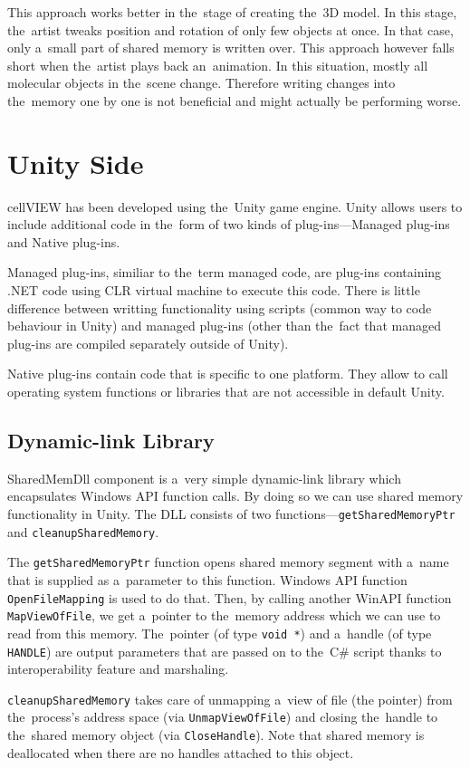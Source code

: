 \documentclass[
  digital, %
  table,   %
  nolof,     %
  nolot,     %
  oneside,
]{fithesis3}
\begin{document}
This approach works better in the stage of creating the 3D model. In this stage, the artist tweaks position and rotation of only few objects at once. In that case, only a small part of shared memory is written over. This approach however falls short when the artist plays back an animation. In this situation, mostly all molecular objects in the scene change. Therefore writing changes into the memory one by one is not beneficial and might actually be performing worse.

\section{Unity Side}
cellVIEW has been developed using the Unity game engine. Unity allows users to include additional code in the form of two kinds of plug-ins—Managed plug-ins and Native plug-ins.

Managed plug-ins, similiar to the term managed code, are plug-ins containing .NET code using CLR virtual machine to execute this code. There is little difference between writting functionality using scripts (common way to code behaviour in Unity) and managed plug-ins (other than the fact that managed plug-ins are compiled separately outside of Unity).

Native plug-ins contain code that is specific to one platform. They allow to call operating system functions or libraries that are not accessible in default Unity.

\subsection{Dynamic-link Library}
SharedMemDll component is a very simple dynamic-link library which encapsulates Windows API function calls. By doing so we can use shared memory functionality in Unity. The DLL consists of two functions—\texttt{get\-Shared\-Memory\-Ptr} and \texttt{cleanup\-Shared\-Memory}.

The \texttt{getSharedMemoryPtr} function opens shared memory segment with a name that is supplied as a parameter to this function. Windows API function \texttt{OpenFileMapping} is used to do that. Then, by calling another WinAPI function \texttt{MapViewOfFile}, we get a pointer to the memory address which we can use to read from this memory. The pointer (of type \texttt{void *}) and a handle (of type \texttt{HANDLE}) are output parameters that are passed on to the C\# script thanks to interoperability feature and marshaling.

\texttt{cleanupSharedMemory} takes care of unmapping a view of file (the pointer) from the process's address space (via \texttt{UnmapViewOfFile}) and closing the handle to the shared memory object (via \texttt{CloseHandle}). Note that shared memory is deallocated when there are no handles attached to this object.
\end{document}
